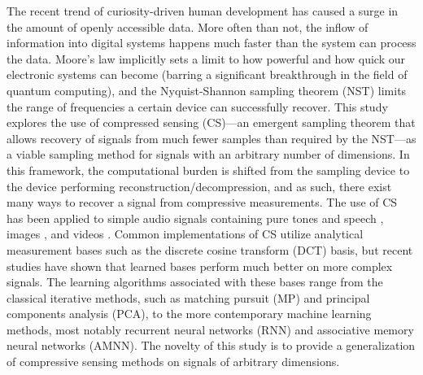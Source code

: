 The recent trend of curiosity-driven human development has caused a surge in the amount of openly accessible data. More often than not, the inflow of information into digital systems happens much faster than the system can process the data. Moore's law implicitly sets a limit to how powerful and how quick our electronic systems can become (barring a significant breakthrough in the field of quantum computing), and the Nyquist-Shannon sampling theorem (NST) limits the range of frequencies a certain device can successfully recover. This study explores the use of compressed sensing (CS)---an emergent sampling theorem that allows recovery of signals from much fewer samples than required by the NST---as a viable sampling method for signals with an arbitrary number of dimensions. In this framework, the computational burden is shifted from the sampling device to the device performing reconstruction/decompression, and as such, there exist many ways to recover a signal from compressive measurements. The use of CS has been applied to simple audio signals containing pure tones \cite{Mathew2016,Andras2018} and speech \cite{Low2013,Low2018,Abrol2015}, images \cite{Mo2013,Zhou2016,Romero2016}, and videos \cite{Liu2014,Chen2014}. Common implementations of CS utilize analytical measurement bases such as the discrete cosine transform (DCT) basis, but recent studies \cite{Liu2013,Sharma2018,Eslahi2016} have shown that learned bases perform much better on more complex signals. The learning algorithms associated with these bases range from the classical iterative methods, such as matching pursuit (MP) and principal components analysis (PCA), to the more contemporary machine learning methods, most notably recurrent neural networks (RNN) and associative memory neural networks (AMNN). The novelty of this study is to provide a generalization of compressive sensing methods on signals of arbitrary dimensions.


